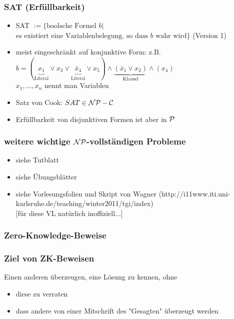 \documentclass{beamer}
\renewcommand{\P}{\ensuremath \mathcal{P}}
\newcommand{\NP}{\ensuremath \mathcal{NP}}
\newcommand{\NPC}{\ensuremath \mathcal{NP-C}}
\begin{document}
\begin{frame}
\frametitle{SAT (Erfüllbarkeit)}
\begin{itemize}
\item SAT $:=\{\text{boolsche Formel } b|$\\$\text{es existiert eine Variablenbelegung, so dass $b$ wahr wird}\}$ (Version 1)
\item meist eingeschränkt auf konjunktive Form: z.B.\\ $b=(\underbrace{x_1}_\text{Literal}\vee x_3\vee\underbrace{\bar{x}_4}_\text{Literal}\vee x_5)\wedge\underbrace{(\bar{x}_1\vee x_2)}_\text{Klausel}\wedge (x_4)$\\ $x_1,\ldots, x_n$ nennt man Variablen\pause
\item Satz von Cook: $SAT\in\NPC$\pause
\item Erfüllbarkeit von disjunktiven Formen ist aber in $\P$
\end{itemize}
\end{frame}

\begin{frame}
\frametitle{weitere wichtige $\NP$-vollständigen Probleme}
\begin{itemize}
\item siehe Tutblatt
\item siehe Übungsblätter
\item siehe Vorlesungsfolien und Skript von Wagner (http://i11www.iti.uni-karlsruhe.de/teaching/winter2011/tgi/index) \\{} [für diese VL natürlich inoffiziell...]
\end{itemize}
\end{frame}

\begin{frame}
\frametitle{Zero-Knowledge-Beweise}
\end{frame}

\begin{frame}
\frametitle{Ziel von ZK-Beweisen}
Einen anderen überzeugen, eine Lösung zu kennen, ohne
\begin{itemize}
\item diese zu verraten
\item dass andere von einer Mitschrift des "Gesagten" überzeugt werden
\end{itemize}
\end{frame}
\end{document}
